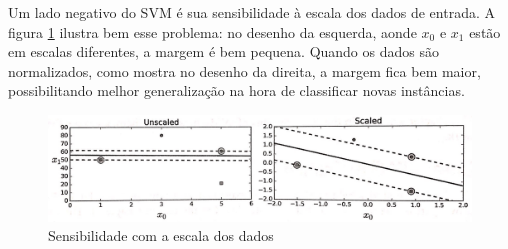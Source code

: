 Um lado negativo do SVM é sua sensibilidade à escala dos dados de entrada. A figura \ref{fig:svm-escala} ilustra bem esse problema: no desenho da esquerda, aonde $x_0$ e $x_1$ estão em escalas diferentes, a margem é bem pequena. Quando os dados são normalizados, como mostra no desenho da direita, a margem fica bem maior, possibilitando melhor generalização na hora de classificar novas instâncias.

\begin{figure}[ht!]
    \centering
    \includegraphics[scale=0.25]{Imagens/smv_escala.png}
    \caption{Sensibilidade com a escala dos dados \cite{Geron:2017}}
    \label{fig:svm-escala}
\end{figure}
